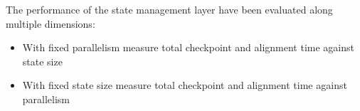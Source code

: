 

 The performance of the state management layer have been evaluated along multiple dimensions:

\begin{itemize}
    \item With fixed parallelism measure total checkpoint and alignment time against state size
    \item With fixed state size measure total checkpoint and alignment time against parallelism
\end{itemize}


